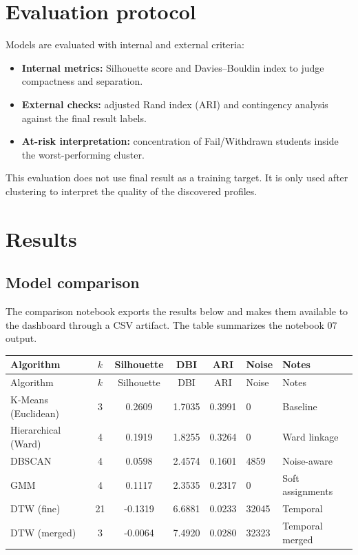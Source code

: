 \documentclass[11pt,a4paper]{article}
\begin{document}
\section{Evaluation protocol}
Models are evaluated with internal and external criteria:
\begin{itemize}[leftmargin=*]
  \item \textbf{Internal metrics:} Silhouette score and Davies--Bouldin index to judge compactness and separation.
  \item \textbf{External checks:} adjusted Rand index (ARI) and contingency analysis against the final result labels.
  \item \textbf{At-risk interpretation:} concentration of Fail/Withdrawn students inside the worst-performing cluster.
\end{itemize}
This evaluation does not use final result as a training target. It is only used after clustering to interpret the quality of the discovered profiles.

\section{Results}
\subsection{Model comparison}
The comparison notebook exports the results below and makes them available to the dashboard through a CSV artifact. The table summarizes the notebook 07 output.

\begin{longtable}{p{3.7cm}ccccp{2.2cm}p{3.2cm}}
\toprule
Algorithm & $k$ & Silhouette & DBI & ARI & Noise & Notes \\
\midrule
\endfirsthead
\toprule
Algorithm & $k$ & Silhouette & DBI & ARI & Noise & Notes \\
\midrule
\endhead
K-Means (Euclidean) & 3 & 0.2609 & 1.7035 & 0.3991 & 0 & Baseline \\
Hierarchical (Ward) & 4 & 0.1919 & 1.8255 & 0.3264 & 0 & Ward linkage \\
DBSCAN & 4 & 0.0598 & 2.4574 & 0.1601 & 4859 & Noise-aware \\
GMM & 4 & 0.1117 & 2.3535 & 0.2317 & 0 & Soft assignments \\
DTW (fine) & 21 & -0.1319 & 6.6881 & 0.0233 & 32045 & Temporal \\
DTW (merged) & 3 & -0.0064 & 7.4920 & 0.0280 & 32323 & Temporal merged \\
\bottomrule
\end{longtable}
\end{document}
